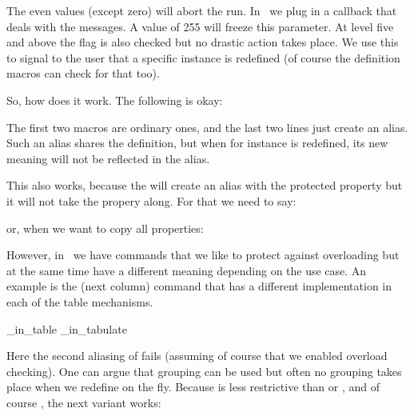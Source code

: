 The even values (except zero) will abort the run. In \CONTEXT\ we plug in a
callback that deals with the messages. A value of 255 will freeze this parameter.
At level five and above the  flag is also checked but no drastic
action takes place. We use this to signal to the user that a specific instance is
redefined (of course the definition macros can check for that too).

So, how does it work. The following is okay:

\starttyping[option=TEX]
\def\MacroB{B}
\let\MyMacro\MacroA
\let\MyMacro\MacroB
\stoptyping

The first two macros are ordinary ones, and the last two lines just create an alias. Such
an alias shares the definition, but when for instance \type {\MacroA} is redefined, its
new meaning will not be reflected in the alias.

\starttyping[option=TEX]
\permanent\protected{}
\permanent\protected\def\MacroB{B}
\let\MyMacro\MacroA
\let\MyMacro\MacroB
\stoptyping

This also works, because the \type {\let} will create an alias with the protected
property but it will not take the  propery along. For that we need
to say:

\starttyping[option=TEX]
\permanent\protected{}
\permanent\protected\def\MacroB{B}
\permanent\let\MyMacro\MacroA
\permanent\let\MyMacro\MacroB
\stoptyping

or, when we want to copy all properties:

\starttyping[option=TEX]
\permanent\protected{}
\permanent\protected\def\MacroB{B}
\aliased\let\MyMacro\MacroA
\aliased\let\MyMacro\MacroB
\stoptyping

However, in \CONTEXT\ we have commands that we like to protect against
overloading but at the same time have a different meaning depending on the use
case. An example is the \type {\NC} (next column) command that has a different
implementation in each of the table mechanisms.

\starttyping[option=TEX]
\permanent\protected{}
\permanent\protected{}
\aliased\let\NC\NC_in_table
\aliased\let\NC\NC_in_tabulate
\stoptyping

Here the second aliasing of \type {\NC} fails (assuming of course that we enabled
overload checking). One can argue that grouping can be used but often no grouping
takes place when we redefine on the fly. Because  is less restrictive
than  or , and of course , the
next variant works:

